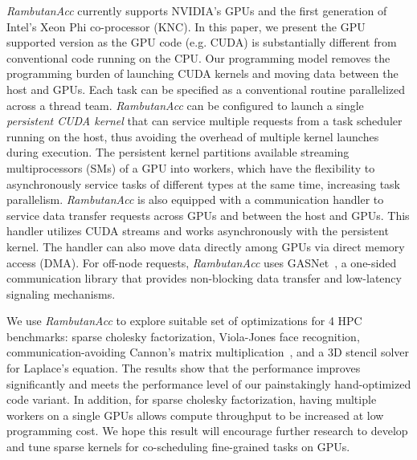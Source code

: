 {\em RambutanAcc} currently supports NVIDIA's GPUs and the first generation of Intel's Xeon Phi co-processor (KNC).
In this paper, we present the GPU supported version as the GPU code (e.g. CUDA) is substantially different from conventional code running on the CPU.
Our programming model removes the programming burden of launching CUDA kernels and moving data between the host and GPUs.
Each task can be specified as a conventional routine parallelized across a thread team.
{\em RambutanAcc} can be configured to launch a single {\em persistent CUDA kernel} that can service multiple requests from a task scheduler running on the host, thus avoiding the overhead of multiple kernel launches during execution.
The persistent kernel partitions available streaming multiprocessors (SMs) of a GPU into workers, which have the flexibility to asynchronously service tasks of different types at the same time, increasing task parallelism.
{\em RambutanAcc} is also equipped with a communication handler to service data transfer requests across GPUs and between the host and GPUs.
This handler utilizes CUDA streams and works asynchronously with the persistent kernel.
The handler can also move data directly among GPUs via direct memory access (DMA).
For off-node requests, {\em RambutanAcc} uses GASNet~\cite{Bonachea:2002:gasnet}, a one-sided communication library %
that provides non-blocking data transfer and low-latency signaling mechanisms. %

We use {\em RambutanAcc} to explore suitable set of optimizations for 4 HPC benchmarks: sparse cholesky factorization, Viola-Jones face recognition, communication-avoiding Cannon's matrix multiplication~\cite{25Dcannon}, and a 3D stencil solver for Laplace's equation.
The results show that the performance improves significantly and meets the performance level of our painstakingly hand-optimized code variant.
In addition, for sparse cholesky factorization, having multiple workers on a single GPUs allows compute throughput to be increased at low programming cost. 
We hope this result will encourage further research to develop and tune sparse kernels for co-scheduling fine-grained tasks on GPUs.

